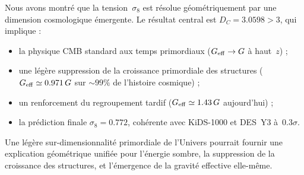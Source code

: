 \documentclass[11pt]{article}
\newcommand{\DC}{D_C}
\newcommand{\Geff}{G_{\rm eff}}
\newcommand{\sig}{\sigma_8}
\begin{document}
Nous avons montré que la tension~$\sig$ est résolue géométriquement
par une dimension cosmologique émergente.
Le résultat central est $\DC = 3.0598 > 3$, qui implique :
\begin{itemize}
  \item la physique CMB standard aux temps primordiaux
        ($\Geff \to G$ à haut~$z$) ;
  \item une légère suppression de la croissance primordiale des
        structures ($\Geff \simeq 0.971\,G$ sur ${\sim}99\%$ de
        l'histoire cosmique) ;
  \item un renforcement du regroupement tardif
        ($\Geff \simeq 1.43\,G$ aujourd'hui) ;
  \item la prédiction finale $\sig = 0.772$, cohérente avec
        KiDS-1000 et DES~Y3 à~$0.3\sigma$.
\end{itemize}

Une légère sur-dimensionnalité primordiale de l'Univers pourrait
fournir une explication géométrique unifiée pour l'énergie sombre,
la suppression de la croissance des structures, et l'émergence
de la gravité effective elle-même.
\end{document}
